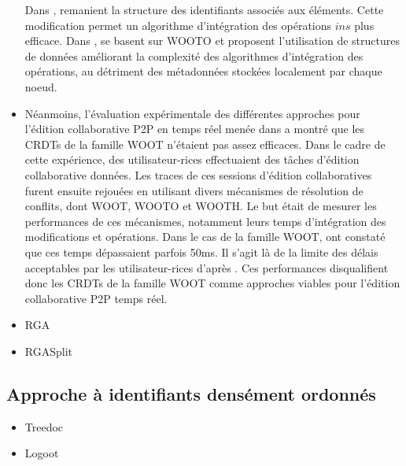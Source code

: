 \documentclass[12pt]{thesul}
\newcommand{\trm}[1]{\mathit{#1}}
\begin{document}
\begin{itemize}
    Dans \cite{2007-wooto-weiss}, \citeauthor{2007-wooto-weiss} remanient la structure des identifiants associés aux éléments.
    Cette modification permet un algorithme d'intégration des opérations $\trm{ins}$ plus efficace.
    Dans \cite{2011-evaluation-crdts-ahmed-nacer}, \citeauthor{2011-evaluation-crdts-ahmed-nacer} se basent sur WOOTO et proposent l'utilisation de structures de données améliorant la complexité des algorithmes d'intégration des opérations, au détriment des métadonnées stockées localement par chaque noeud.
  \item Néanmoins, l'évaluation expérimentale des différentes approches pour l'édition collaborative \ac{P2P} en temps réel menée dans \cite{2011-evaluation-crdts-ahmed-nacer} a montré que les \acp{CRDT} de la famille WOOT n'étaient pas assez efficaces.
    Dans le cadre de cette expérience, des utilisateur-rices effectuaient des tâches d'édition collaborative données.
    Les traces de ces sessions d'édition collaboratives furent ensuite rejouées en utilisant divers mécanismes de résolution de conflits, dont WOOT, WOOTO et WOOTH.
    Le but était de mesurer les performances de ces mécanismes, notamment leurs temps d'intégration des modifications et opérations.
    Dans le cas de la famille WOOT, \citeauthor{2011-evaluation-crdts-ahmed-nacer} ont constaté que ces temps dépassaient parfois 50ms.
    Il s'agit là de la limite des délais acceptables par les utilisateur-rices d'après \cite{1984-human-performance-with-computers-shneiderman,2007-modeling-effects-delayed-feedback-jay}.
    Ces performances disqualifient donc les \acp{CRDT} de la famille WOOT comme approches viables pour l'édition collaborative \ac{P2P} temps réel.
\end{itemize}

\begin{itemize}
  \item RGA \cite{ROH2011354}
  \item RGASplit \cite{briot:hal-01343941}
\end{itemize}

\subsection{Approche à identifiants densément ordonnés}

\begin{itemize}
  \item Treedoc \cite{5158449}
  \item Logoot \cite{WeissICDCS09, weiss:hal-00450416}
\end{itemize}
\end{document}
